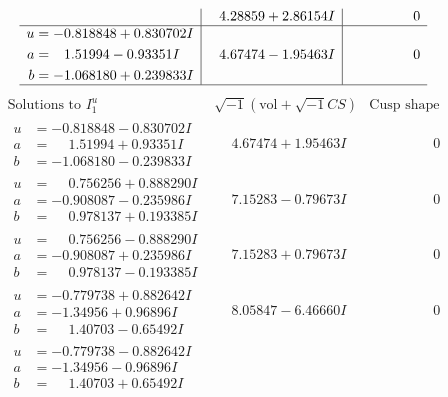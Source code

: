 \documentclass[1p]{elsarticle_modified}
\theoremstyle{definition}
\newcommand{\I}{\sqrt{-1}}
\begin{document}
$$\begin{array}{c|c|c}
 & \phantom{-}4.28859 + 2.86154 I & \phantom{-0.000000 } 0 \\ \hline\begin{aligned}
u &= -0.818848 + 0.830702 I \\
a &= \phantom{-}1.51994 - 0.93351 I \\
b &= -1.068180 + 0.239833 I\end{aligned}
 & \phantom{-}4.67474 - 1.95463 I & \phantom{-0.000000 } 0\\
 \hline 
 \end{array}$$\newpage$$\begin{array}{c|c|c}  
\text{Solutions to }I^u_{1}& \I (\text{vol} + \sqrt{-1}CS) & \text{Cusp shape}\\
 \hline 
\begin{aligned}
u &= -0.818848 - 0.830702 I \\
a &= \phantom{-}1.51994 + 0.93351 I \\
b &= -1.068180 - 0.239833 I\end{aligned}
 & \phantom{-}4.67474 + 1.95463 I & \phantom{-0.000000 } 0 \\ \hline\begin{aligned}
u &= \phantom{-}0.756256 + 0.888290 I \\
a &= -0.908087 - 0.235986 I \\
b &= \phantom{-}0.978137 + 0.193385 I\end{aligned}
 & \phantom{-}7.15283 - 0.79673 I & \phantom{-0.000000 } 0 \\ \hline\begin{aligned}
u &= \phantom{-}0.756256 - 0.888290 I \\
a &= -0.908087 + 0.235986 I \\
b &= \phantom{-}0.978137 - 0.193385 I\end{aligned}
 & \phantom{-}7.15283 + 0.79673 I & \phantom{-0.000000 } 0 \\ \hline\begin{aligned}
u &= -0.779738 + 0.882642 I \\
a &= -1.34956 + 0.96896 I \\
b &= \phantom{-}1.40703 - 0.65492 I\end{aligned}
 & \phantom{-}8.05847 - 6.46660 I & \phantom{-0.000000 } 0 \\ \hline\begin{aligned}
u &= -0.779738 - 0.882642 I \\
a &= -1.34956 - 0.96896 I \\
b &= \phantom{-}1.40703 + 0.65492 I\end{aligned}

\end{array}$$
\end{document}
